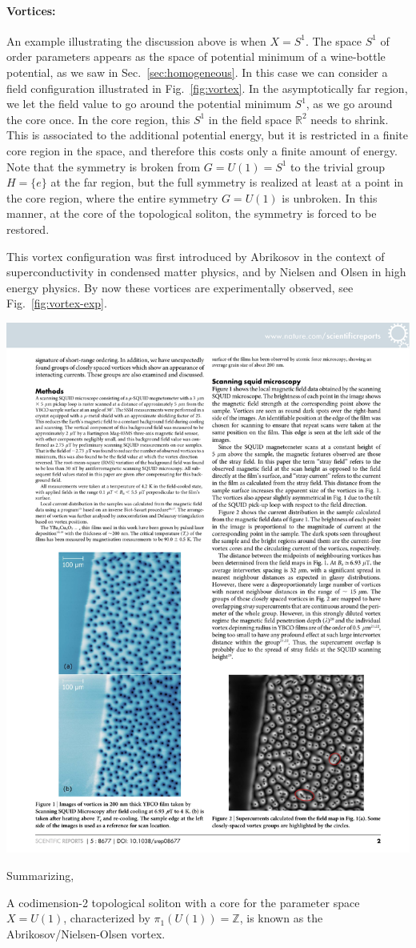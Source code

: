 \documentclass[12pt]{article}
\numberwithin{equation}{section}
\numberwithin{figure}{section}
\theoremstyle{remark}
\renewenvironment{figure}[1][]{
  \begin{originalfigure}[#1]
    \begin{mdframed}[linecolor=black!0,backgroundcolor=black!1]
}{
    \end{mdframed}
  \end{originalfigure}
}
\def\bR{\mathbb{R}}
\def\bZ{\mathbb{Z}}
\begin{document}
\paragraph{Vortices:}
An example illustrating the discussion above is when $X=S^1$.
The space $S^1$ of order parameters appears as the space of potential minimum of a wine-bottle potential, as we saw in Sec.~\ref{sec:homogeneous}.
In this case we can consider a field configuration illustrated in Fig.~\ref{fig:vortex}.
In the asymptotically far region, we let the field value  to go around the potential minimum $S^1$,
as we go around the core once. 
In the core region, this $S^1$ in the field space $\bR^2$ needs to shrink. 
This is associated to the additional potential energy, but it is restricted in a finite core region in the space,
and therefore this costs only a finite amount of energy.
Note that the symmetry is broken from $G=U(1)=S^1$ to the trivial group $H=\{e\}$ at the far region,
but the full symmetry is realized at least at a point in the core region,
where the entire  symmetry $G=U(1)$ is unbroken.
In this manner, at the core of the topological soliton, the symmetry is forced to be restored. 




This vortex configuration was first introduced by Abrikosov \cite{Abrikosov:1956sx} in the context of superconductivity 
in condensed matter physics,
and by Nielsen and Olsen \cite{Nielsen:1973cs} in high energy physics. 
By now these vortices are experimentally observed, see Fig.~\ref{fig:vortex-exp}.
\begin{figure}[h]
\centering
\includegraphics[width=.5\textwidth]{vortices.pdf}
\caption{A scanning SQUID-microscope view of the vortices in a superconducting material.
Taken from \cite{VortexExp}.}
\label{fig:vortex-exp}
\end{figure}
Summarizing, 
\begin{example}
A codimension-2 topological soliton with a core for the parameter space $X=U(1)$,
characterized by $\pi_1(U(1))=\bZ$,
is known as the Abrikosov/Nielsen-Olsen vortex.
\end{example}
\end{document}
